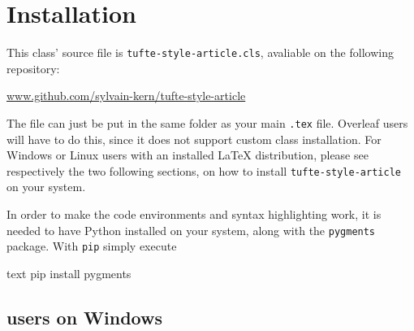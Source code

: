 \documentclass[raggedright, twoside, 11pt, colorful]{tufte-style-article}
\begin{document}
\section{Installation}

This class' source file is \texttt{tufte-style-article.cls}, avaliable on the following repository:

\url{www.github.com/sylvain-kern/tufte-style-article}

The file can just be put in the same folder as your main \texttt{.tex} file. Overleaf users will have to do this, since it does not support custom class installation. For Windows or Linux users with an installed \LaTeX{} distribution, please see respectively the two following sections, on how to install \texttt{tufte-style-article} on your system.

In order to make the code environments and syntax highlighting work, it is needed to have Python installed on your system, along with the \texttt{pygments} package. With \texttt{pip} simply execute
\begin{codebox}{text}
pip install pygments
\end{codebox}

\subsection{ users on Windows}
\end{document}
